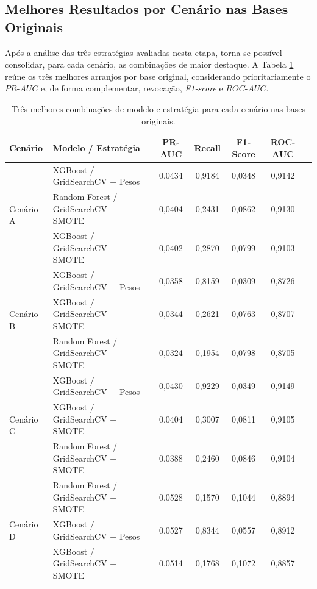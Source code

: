 \subsection{Melhores Resultados por Cenário nas Bases Originais}

Após a análise das três estratégias avaliadas nesta etapa, torna-se possível consolidar, para cada cenário, as combinações de maior destaque. A Tabela \ref{tab:melhores_por_cenario_sem_feat} reúne os três melhores arranjos por base original, considerando prioritariamente o $PR\text{-}AUC$ e, de forma complementar, revocação, \textit{F1-score} e $ROC\text{-}AUC$.

\begin{table}[ht]
\centering
\caption{Três melhores combinações de modelo e estratégia para cada cenário nas bases originais.}
\label{tab:melhores_por_cenario_sem_feat}
\small
\begin{tabular}{llccccc}
\toprule
\textbf{Cenário} & \textbf{Modelo / Estratégia} & \textbf{PR-AUC} & \textbf{Recall} & \textbf{F1-Score} & \textbf{ROC-AUC} \\
\midrule
\multirow{3}{*}{Cenário A} 
& XGBoost / GridSearchCV + Pesos   & 0,0434 & 0,9184 & 0,0348 & 0,9142 \\
& Random Forest / GridSearchCV + SMOTE & 0,0404 & 0,2431 & 0,0862 & 0,9130 \\
& XGBoost / GridSearchCV + SMOTE   & 0,0402 & 0,2870 & 0,0799 & 0,9103 \\
\midrule
\multirow{3}{*}{Cenário B} 
& XGBoost / GridSearchCV + Pesos   & 0,0358 & 0,8159 & 0,0309 & 0,8726 \\
& XGBoost / GridSearchCV + SMOTE   & 0,0344 & 0,2621 & 0,0763 & 0,8707 \\
& Random Forest / GridSearchCV + SMOTE & 0,0324 & 0,1954 & 0,0798 & 0,8705 \\
\midrule
\multirow{3}{*}{Cenário C} 
& XGBoost / GridSearchCV + Pesos   & 0,0430 & 0,9229 & 0,0349 & 0,9149 \\
& XGBoost / GridSearchCV + SMOTE   & 0,0404 & 0,3007 & 0,0811 & 0,9105 \\
& Random Forest / GridSearchCV + SMOTE & 0,0388 & 0,2460 & 0,0846 & 0,9104 \\
\midrule
\multirow{3}{*}{Cenário D} 
& Random Forest / GridSearchCV + SMOTE & 0,0528 & 0,1570 & 0,1044 & 0,8894 \\
& XGBoost / GridSearchCV + Pesos   & 0,0527 & 0,8344 & 0,0557 & 0,8912 \\
& XGBoost / GridSearchCV + SMOTE   & 0,0514 & 0,1768 & 0,1072 & 0,8857 \\

\end{tabular}
\end{table}
